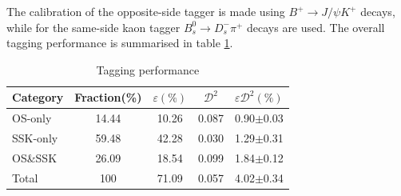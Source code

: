 The calibration of the opposite-side tagger is made using $B^+ \rightarrow J/\psi K^+$ decays, while for the same-side kaon tagger $B_s^0 \rightarrow D_s^- \pi^+$ decays are used. The overall tagging performance is summarised in table \ref{tab:Tagging}. 

\begin{table}[h]
  \begin{center}
     \caption{Tagging performance}
  \label{tab:Tagging}
  \begin{tabular}{lcccc}
  \hline
    Category     & Fraction(\%) & $\varepsilon(\%)$  & $\mathcal{D}^{2}$   & $\varepsilon\mathcal{D}^{2}(\%)$ \\
    \hline                                                           
    OS-only  &14.44 & 10.26 & 0.087 & 0.90$\pm$0.03 \\ 
    SSK-only &59.48 & 42.28 & 0.030 & 1.29$\pm$0.31 \\ 
    OS\&SSK  &26.09 & 18.54 & 0.099 & 1.84$\pm$0.12 \\  
    \hline
    Total    &100  & 71.09 & 0.057 & 4.02$\pm$0.34 \\  
    \hline
  \end{tabular}
  \end{center}
\end{table}

